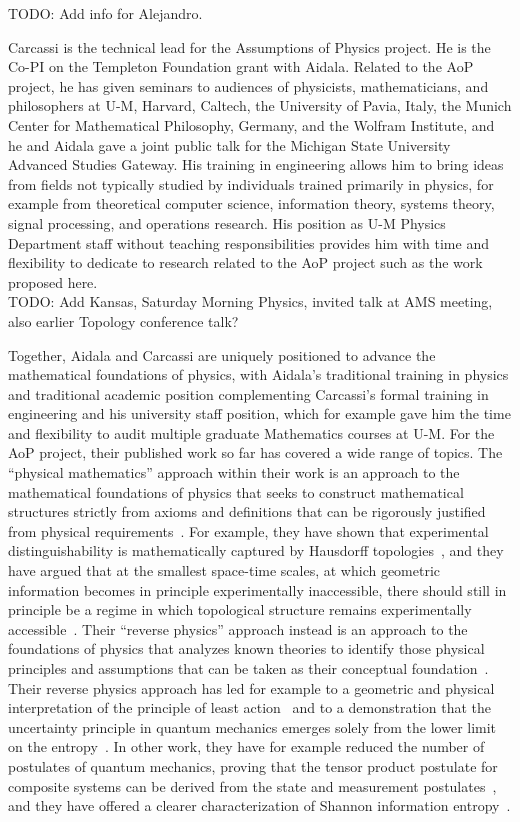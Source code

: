 TODO: Add info for Alejandro.

Carcassi is the technical lead for the Assumptions of Physics project.  He is the Co-PI on the Templeton Foundation grant with Aidala.  Related to the AoP project, he has given seminars to audiences of physicists, mathematicians, and philosophers at U-M, Harvard, Caltech, the University of Pavia, Italy, the Munich Center for Mathematical Philosophy, Germany, and the Wolfram Institute, and he and Aidala gave a joint public talk for the Michigan State University Advanced Studies Gateway.  His training in engineering allows him to bring ideas from fields not typically studied by individuals trained primarily in physics, for example from theoretical computer science, information theory, systems theory, signal processing, and operations research.  His position as U-M Physics Department staff without teaching responsibilities provides him with time and flexibility to dedicate to research related to the AoP project such as the work proposed here. \\
TODO: Add Kansas, Saturday Morning Physics, invited talk at AMS meeting, also earlier Topology conference talk?

Together, Aidala and Carcassi are uniquely positioned to advance the mathematical foundations of physics, with Aidala's traditional training in physics and traditional academic position complementing Carcassi's formal training in engineering and his university staff position, which for example gave him the time and flexibility to audit multiple graduate Mathematics courses at U-M.  For the AoP project, their published work so far has covered a wide range of topics.  The ``physical mathematics'' approach within their work is an approach to the mathematical foundations of physics that seeks to construct mathematical structures strictly from axioms and definitions that can be rigorously justified from physical requirements~\cite{aop-book}.  For example, they have shown that experimental distinguishability is mathematically captured by Hausdorff topologies~\cite{aop-book,aop-topExpDisting}, and they have argued that at the smallest space-time scales, at which geometric information becomes in principle experimentally inaccessible, there should still in principle be a regime in which topological structure remains experimentally accessible~\cite{aop-spacetimeStruct}.  Their ``reverse physics'' approach instead is an approach to the foundations of physics that analyzes known theories to identify those physical principles and assumptions that can be taken as their conceptual foundation~\cite{aop-book,Carcassi:2022bpm}. Their reverse physics approach has led for example to a geometric and physical interpretation of the principle of least action~\cite{aop-action} and to a demonstration that the uncertainty principle in quantum mechanics emerges solely from the lower limit on the entropy~\cite{Carcassi:2022bpm}. In other work, they have for example reduced the number of postulates of quantum mechanics, proving that the tensor product postulate for composite systems can be derived from the state and measurement postulates~\cite{Carcassi2021four}, and they have offered a clearer characterization of Shannon information entropy~\cite{Carcassi:2021}. 

